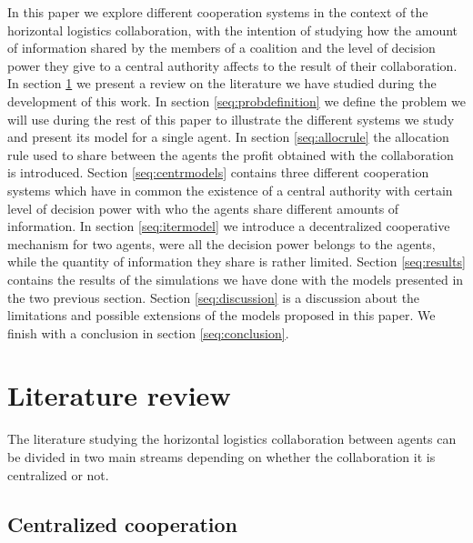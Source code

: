 \documentclass{article}
\begin{document}
In this paper we explore different cooperation systems in the context of the horizontal logistics collaboration, with the intention of studying how the amount of information shared by the members of a coalition and the level of decision power they give to a central authority affects to the result of their collaboration. In section \ref{seq:litreview} we present a review on the literature we have studied during the development of this work. In section \ref{seq:probdefinition} we define the problem we will use during the rest of this paper to illustrate the different systems we study and present its model for a single agent. In section \ref{seq:allocrule} the allocation rule used to share between the agents the profit obtained with the collaboration is introduced. Section \ref{seq:centrmodels} contains three different cooperation systems which have in common the existence of a central authority with certain level of decision power with who the agents share different amounts of information. In section \ref{seq:itermodel} we introduce a decentralized cooperative mechanism for two agents, were all the decision power belongs to the agents, while the quantity of information they share is rather limited. Section \ref{seq:results} contains the results of the simulations we have done with the models presented in the two previous section. Section \ref{seq:discussion} is a discussion about the limitations and possible extensions of the models proposed in this paper. We finish with a conclusion in section \ref{seq:conclusion}.



\section{Literature review}\label{seq:litreview}

The literature studying the horizontal logistics collaboration between agents
can be divided in two main streams depending on whether the collaboration it is
centralized or not.

\subsection{Centralized cooperation}
\end{document}
